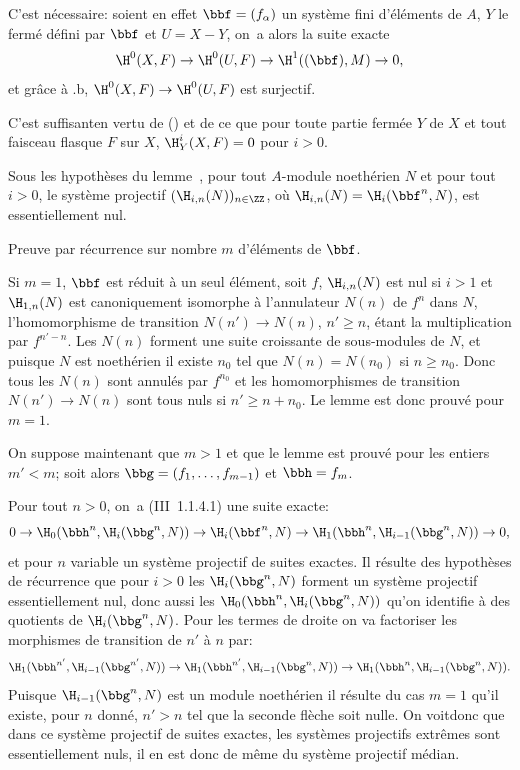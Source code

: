 C'est n\'ecessaire: soient en effet $\bbf=(f_{\alpha})$ un syst\`eme fini d'\'el\'ements de $A$, $Y$ le ferm\'e d\'efini par $\bbf$ et $U=X-Y$, on~a alors la suite exacte
\begin{equation*} \H^0(X, F) \to \H^0(U, F) \to \H^1((\bbf), M) \to 0,
\end{equation*}
et gr\^ace \`a .b, $\H^0(X, F)\to\H^0(U, F)$ est surjectif.

C'est suffisant\pageoriginale en vertu de () et de ce que pour toute partie ferm\'ee $Y$ de $X$ et tout faisceau flasque $F$ sur $X$, $\H_Y^i(X, F)=0$ pour $i>0$.

\begin{suplemme} \label{II.11} Sous les hypoth\`eses du lemme~, pour tout $A$-module noeth\'erien $N$ et pour tout $i>0$, le syst\`eme projectif $(\H_{i, n}(N))_{n\in\ZZ}$, o\`u $\H_{i, n}(N)=\H_i(\bbf^n, N)$, est essentiellement nul.
\end{suplemme}

Preuve par r\'ecurrence sur  nombre $m$ d'\'el\'ements de $\bbf$.

Si $m=1$, $\bbf$ est r\'eduit \`a un seul \'el\'ement, soit $f$, $\H_{i, n}(N)$ est nul si $i>1$ et $\H_{1, n}(N)$ est canoniquement isomorphe \`a l'annulateur $N(n)$ de $f^n$ dans $N$, l'homomorphisme de transition $N(n')\to N(n)$, $n'\geq n$, \'etant la multiplication par $f^{n'-n}$. Les $N(n)$ forment une suite croissante de sous-modules de $N$, et puisque $N$ est noeth\'erien il existe $n_0$ tel que $N(n)=N(n_0)$ si $n\geq n_0$. Donc tous les $N(n)$ sont annul\'es par $f^{n_0}$ et les homomorphismes de transition $N(n')\to N(n)$ sont tous nuls si $n'\geq n+n_0$. Le lemme est donc prouv\'e pour $m=1$.

On suppose maintenant que $m>1$ et que le lemme est prouv\'e pour les entiers $m'<m$; soit alors $\bbg=(f_1, \ldots, f_{m-1})$ et $\bbh=f_m$.

Pour tout $n>0$, on~a (\EGA III~1.1.4.1) une suite exacte:
\begin{equation*}
0 \to \H_0(\bbh^n, \H_i(\bbg^n, N)) \to \H_i(\bbf^n, N) \to \H_1(\bbh^n, \H_{i-1}(\bbg^n, N)) \to 0,
\end{equation*}
et pour $n$ variable un syst\`eme projectif de suites exactes. Il r\'esulte des hypoth\`eses de r\'ecurrence que pour $i>0$ les $\H_i(\bbg^n, N)$ forment un syst\`eme projectif essentiellement nul, donc aussi les $\H_0(\bbh^n, \H_i(\bbg^n, N))$ qu'on identifie \`a des quotients de $\H_i(\bbg^n, N)$. Pour les termes de droite on va factoriser les morphismes de transition de $n'$ \`a $n$ par:
\begin{equation*}
\H_1(\bbh^{n'}, \H_{i-1}(\bbg^{n'}, N)) \to \H_1(\bbh^{n'}, \H_{i-1}(\bbg^{n}, N)) \to \H_1(\bbh^{n}, \H_{i-1}(\bbg^{n}, N)).
\end{equation*}
Puisque $\H_{i-1}(\bbg^{n}, N)$ est un module noeth\'erien il r\'esulte du cas $m=1$ qu'il existe, pour $n$ donn\'e, $n'>n$ tel que la seconde fl\`eche soit nulle. On voit\pageoriginale donc que dans ce syst\`eme projectif de suites exactes, les syst\`emes projectifs extr\^emes sont essentiellement nuls, il en est donc de m\^eme du syst\`eme projectif m\'edian.

